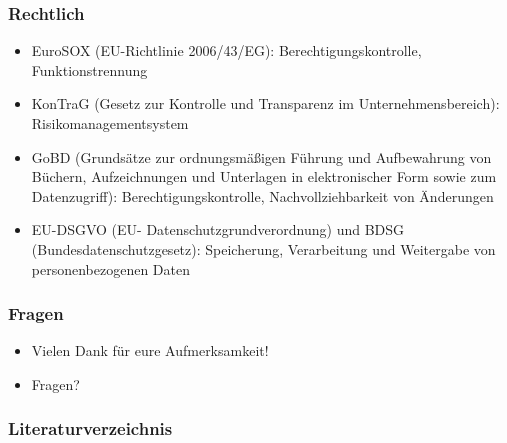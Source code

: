 \documentclass[11pt]{beamer}
\begin{document}
\begin{frame}
  \frametitle{Rechtlich}
  \begin{itemize}
    \item EuroSOX (EU-Richtlinie 2006/43/EG): Berechtigungskontrolle, Funktionstrennung
    \item KonTraG (Gesetz zur Kontrolle und Transparenz im Unternehmensbereich): Risikomanagementsystem
    \item GoBD (Grundsätze zur ordnungsmäßigen Führung und Aufbewahrung von Büchern, Aufzeichnungen und Unterlagen in elektronischer Form sowie zum Datenzugriff): Berechtigungskontrolle, Nachvollziehbarkeit von Änderungen
    \item EU-DSGVO (EU- Datenschutzgrundverordnung) und BDSG (Bundesdatenschutzgesetz): Speicherung, Verarbeitung und Weitergabe von personenbezogenen Daten~
  \end{itemize}
\end{frame}

\begin{frame}
  \frametitle{Fragen}
  \begin{itemize}
    \item Vielen Dank für eure Aufmerksamkeit!
    \item Fragen?
  \end{itemize}
\end{frame}

\begin{frame}[allowframebreaks]
  \frametitle{Literaturverzeichnis}
  \printbibliography
\end{frame}
\end{document}
